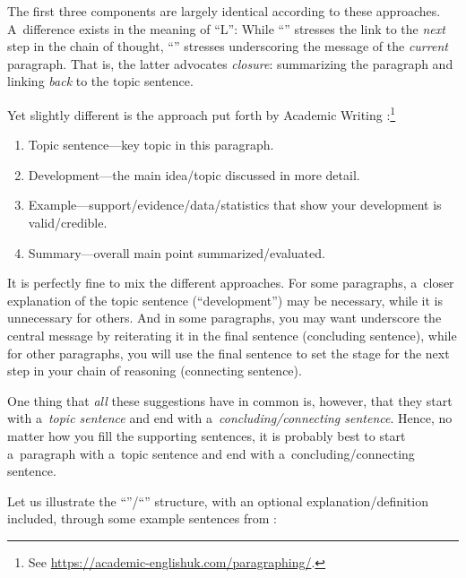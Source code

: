 The first three components are largely identical according to these approaches. A~difference exists in the meaning of ``L'': While ``'' stresses the link to the \emph{next} step in the chain of thought, ``'' stresses underscoring the message of the \emph{current} paragraph. That is, the latter advocates \emph{closure}: summarizing the paragraph and linking \emph{back} to the topic sentence.

Yet slightly different is the approach put forth by Academic Writing :\footnote{See \url{https://academic-englishuk.com/paragraphing/}.}
\begin{enumerate}
	\item Topic sentence---key topic in this paragraph.
	\item Development---the main idea\slash topic discussed in more detail.
	\item Example---support\slash evidence\slash data\slash statistics that show your development is valid\slash credible.
	\item Summary---overall main point summarized\slash evaluated.
\end{enumerate}

It is perfectly fine to mix the different approaches. For some paragraphs, a~closer explanation of the topic sentence (``development'') may be necessary, while it is unnecessary for others. And in some paragraphs, you may want underscore the central message by reiterating it in the final sentence (concluding sentence), while for other paragraphs, you will use the final sentence to set the stage for the next step in your chain of reasoning (connecting sentence).

One thing that \emph{all} these suggestions have in common is, however, that they start with a~\emph{topic sentence} and end with a~\emph{concluding\slash connecting sentence}. Hence, no matter how you fill the supporting sentences, it is probably best to start a~paragraph with a~topic sentence and end with a~concluding\slash connecting sentence.

Let us illustrate the ``''\slash``'' structure, with an optional explanation\slash def\-i\-ni\-tion included, through some example sentences from \citet{sigfridsson}:

